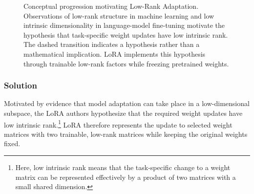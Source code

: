 \begin{figure}[htbp]

	\caption{
		Conceptual progression motivating Low-Rank Adaptation.
		Observations of low-rank structure in machine learning
		and low intrinsic dimensionality in language-model
		fine-tuning motivate the hypothesis that task-specific
		weight updates have low intrinsic rank.
		The dashed transition indicates a hypothesis rather
		than a mathematical implication.
		LoRA implements this hypothesis through trainable
		low-rank factors while freezing pretrained weights.
	}
	\label{fig:lora_motivation}
\end{figure}

\subsubsection{Solution}

Motivated by evidence that model adaptation can take place in a low-dimensional subspace, the LoRA authors hypothesize that the required weight updates have low intrinsic rank.\footnote{Here, low intrinsic rank means that the task-specific change to a weight matrix can be represented effectively by a product of two matrices with a small shared dimension.} LoRA therefore represents the update to selected weight matrices with two trainable, low-rank matrices while keeping the original weights fixed.

